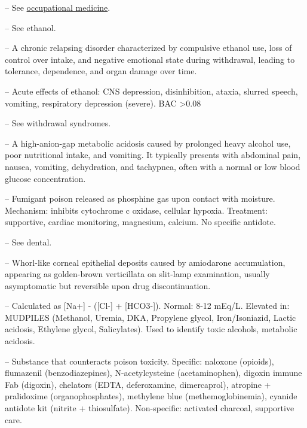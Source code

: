 -- See \hyperlink{Occupational Medicine}{occupational medicine}.

-- See ethanol.

-- A chronic relapsing disorder characterized by compulsive ethanol use, loss of control over intake, and negative emotional state during withdrawal, leading to tolerance, dependence, and organ damage over time.

-- Acute effects of ethanol: CNS depression, disinhibition, ataxia, slurred speech, vomiting, respiratory depression (severe). BAC >0.08%

-- See withdrawal syndromes.

-- A high-anion-gap metabolic acidosis caused by prolonged heavy alcohol use, poor nutritional intake, and vomiting. It typically presents with abdominal pain, nausea, vomiting, dehydration, and tachypnea, often with a normal or low blood glucose concentration.

-- Fumigant poison released as phosphine gas upon contact with moisture. Mechanism: inhibits cytochrome c oxidase, cellular hypoxia. Treatment: supportive, cardiac monitoring, magnesium, calcium. No specific antidote.

-- See dental.

-- Whorl-like corneal epithelial deposits caused by amiodarone accumulation, appearing as golden-brown verticillata on slit-lamp examination, usually asymptomatic but reversible upon drug discontinuation.

-- Calculated as [Na+] - ([Cl-] + [HCO3-]). Normal: 8-12 mEq/L. Elevated in: MUDPILES (Methanol, Uremia, DKA, Propylene glycol, Iron/Isoniazid, Lactic acidosis, Ethylene glycol, Salicylates). Used to identify toxic alcohols, metabolic acidosis.

-- Substance that counteracts poison toxicity. Specific: naloxone (opioids), flumazenil (benzodiazepines), N-acetylcysteine (acetaminophen), digoxin immune Fab (digoxin), chelators (EDTA, deferoxamine, dimercaprol), atropine + pralidoxime (organophosphates), methylene blue (methemoglobinemia), cyanide antidote kit (nitrite + thiosulfate). Non-specific: activated charcoal, supportive care.

